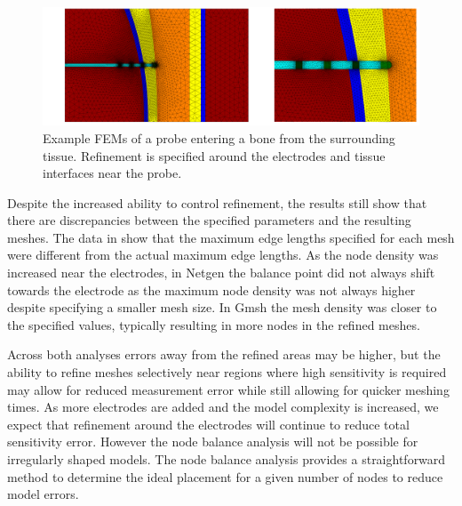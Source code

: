 \begin{figure}[H]
  \includegraphics[width=\columnwidth]{chapter4-mesh_refinement/imgs/advanced_mesh_combined.pdf}
    \caption[Advanced mesh example of an internal probe]{\label{fig:adv_mesh} Example FEMs of a probe entering a bone from the surrounding 
    tissue. Refinement is specified around the electrodes and tissue interfaces near the probe.}
\end{figure}

Despite the increased ability to control refinement, the results still show that there are
discrepancies between the specified parameters and the resulting meshes. The data in 
 show that the maximum edge lengths specified for each mesh 
were different from the actual maximum edge lengths. As the node density was increased
near the electrodes, in Netgen the balance point did not always shift towards the electrode
as the maximum node density was not always higher despite specifying a smaller mesh size.
In Gmsh the mesh density was closer to the specified values, typically resulting in more
nodes in the refined meshes. 

Across both analyses errors away from the refined areas may be higher,
but the ability to refine meshes selectively near regions where high sensitivity 
is required may allow for reduced measurement error while still allowing for quicker 
meshing times.
As more electrodes are added and the model complexity is increased, we expect that 
refinement around the electrodes will continue to reduce total sensitivity error. However 
the node balance analysis will not be possible for irregularly shaped models.
The node balance analysis provides a straightforward method to determine the 
ideal placement for a given number of nodes to reduce model errors.


